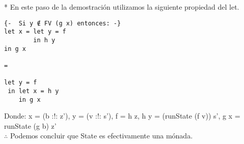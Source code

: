 \documentclass[11pt]{article}
\begin{document}
* En este paso de la demostración utilizamos la siguiente propiedad del let.
\begin{verbatim}
{-  Si y ∉ FV (g x) entonces: -} 
let x = let y = f
        in h y 
in g x  

= 

let y = f
 in let x = h y
    in g x 
\end{verbatim}
Donde:
x = (b :!: z'), y = (v :!: s'), f = h z, h y = (runState (f v)) s', g x = runState (g b) z' \\

$\therefore$ Podemos concluir que State es efectivamente una mónada.
\end{document}
